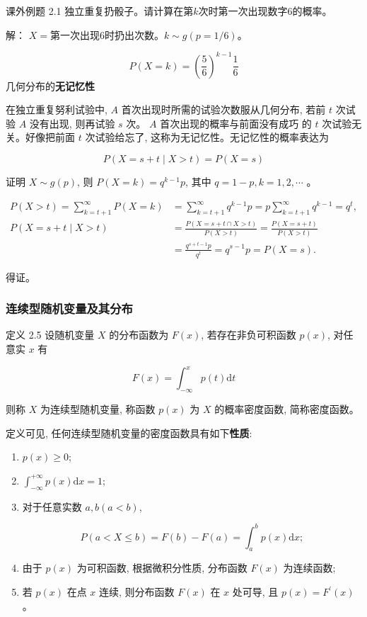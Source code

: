 \documentclass{beamer}
\begin{document}
		
	\begin{frame}
		课外例题 2.1 独立重复扔骰子。请计算在第$k$次时第一次出现数字6的概率。
	\end{frame}
	
	\begin{frame}
		解： $X = \text{第一次出现6时扔出次数。}$$k \sim g(p = 1 / 6)$。
		
		\[
		P(X = k) = (\frac{5}{6}) ^{k - 1}\frac{1}{6}
		\]
		几何分布的\textbf{无记忆性} 
		
		在独立重复努利试验中, $A$ 首次出现时所需的试验次数服从几何分布, 若前 $t$ 次试验 $A$ 没有出现, 则再试验 $s$ 次。 $A$ 首次出现的概率与前面没有成巧 的 $t$ 次试验无关。好像把前面 $t$ 次试验给忘了, 这称为无记忆性。无记忆性的概率表达为
		
		 $$P(X=s+t \mid X>t)=P(X=s)$$
	\end{frame}
	\begin{frame}
		证明 $X \sim g(p)$, 则 $P(X=k)=q^{k-1} p$, 其中 $q=1-p, k=1,2, \cdots$ 。
		
		$$
		\begin{aligned}
			P(X>t)=\sum_{k=t+1}^{\infty} P(X=k) & =\sum_{k=t+1}^{\infty} q^{k-1} p=p \sum_{k=t+1}^{\infty} q^{k-1}=q^{t}, \\
			P(X=s+t \mid X>t) & =\frac{P(X=s+t \cap X>t)}{P(X>t)}=\frac{P(X=s+t)}{P(X>t)} \\
			& =\frac{q^{s+t-1} p}{q^{t}}=q^{s-1} p=P(X=s) .
		\end{aligned}
		$$
		
		得证。
	\end{frame}
	
	\begin{frame}
		\frametitle{连续型随机变量及其分布}
		定义 2.5 设随机变量 $X$ 的分布函数为 $F(x)$, 若存在非负可积函数 $p(x)$, 对任意实 $x$ 有
		
		$$
		F(x)=\int_{-\infty}^{x} p(t) \mathrm{d} t
		$$
		
		则称 $X$ 为连续型随机变量, 称函数 $p(x)$ 为 $X$ 的概率密度函数, 简称密度函数。
	\end{frame}
	
	\begin{frame}
		定义可见, 任何连续型随机变量的密度函数具有如下\textbf{性质}:
		\begin{enumerate}[1]
			\item $p(x) \geqslant 0$;
			\item $\int_{-\infty}^{+\infty} p(x) \mathrm{d} x=1$;  
			\item 对于任意实数 $a, b(a<b)$,
			
			$$
			P(a<X \leqslant b)=F(b)-F(a)=\int_{a}^{b} p(x) \mathrm{d} x ;
			$$
			\item 由于 $p(x)$ 为可积函数, 根据微积分性质, 分布函数 $F(x)$ 为连续函数;
			\item 若 $p(x)$ 在点 $x$ 连续, 则分布函数 $F(x)$ 在 $x$ 处可导, 且 $p(x)=F^{\prime}(x)$ 。
		\end{enumerate}
	\end{frame}
	
\end{document}
